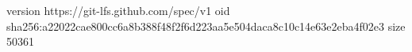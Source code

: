 version https://git-lfs.github.com/spec/v1
oid sha256:a22022cae800cc6a8b388f48f2f6d223aa5e504daca8c10c14e63e2eba4f02e3
size 50361
